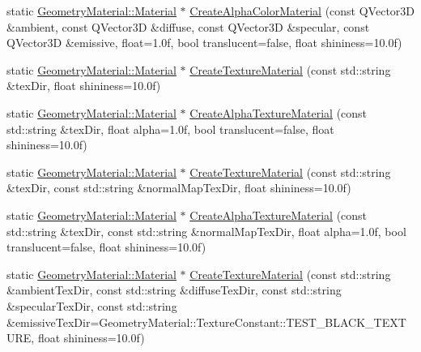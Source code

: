 \begin{DoxyCompactItemize}
\item 
static \mbox{\hyperlink{class_geometry_engine_1_1_geometry_material_1_1_material}{Geometry\+Material\+::\+Material}} $\ast$ \mbox{\hyperlink{class_geometry_engine_1_1_geometry_factory_a3d37605b9cc44fd0b3a058f961b76a35}{Create\+Alpha\+Color\+Material}} (const Q\+Vector3D \&ambient, const Q\+Vector3D \&diffuse, const Q\+Vector3D \&specular, const Q\+Vector3D \&emissive, float=1.\+0f, bool translucent=false, float shininess=10.\+0f)
\item 
static \mbox{\hyperlink{class_geometry_engine_1_1_geometry_material_1_1_material}{Geometry\+Material\+::\+Material}} $\ast$ \mbox{\hyperlink{class_geometry_engine_1_1_geometry_factory_a5362b394e75092bc6bb825c3eb7255ce}{Create\+Texture\+Material}} (const std\+::string \&tex\+Dir, float shininess=10.\+0f)
\item 
static \mbox{\hyperlink{class_geometry_engine_1_1_geometry_material_1_1_material}{Geometry\+Material\+::\+Material}} $\ast$ \mbox{\hyperlink{class_geometry_engine_1_1_geometry_factory_adae01f43608a0e55b1e9f831efed6940}{Create\+Alpha\+Texture\+Material}} (const std\+::string \&tex\+Dir, float alpha=1.\+0f, bool translucent=false, float shininess=10.\+0f)
\item 
static \mbox{\hyperlink{class_geometry_engine_1_1_geometry_material_1_1_material}{Geometry\+Material\+::\+Material}} $\ast$ \mbox{\hyperlink{class_geometry_engine_1_1_geometry_factory_a5f40952552368c0c0db6d07d42ef17c5}{Create\+Texture\+Material}} (const std\+::string \&tex\+Dir, const std\+::string \&normal\+Map\+Tex\+Dir, float shininess=10.\+0f)
\item 
static \mbox{\hyperlink{class_geometry_engine_1_1_geometry_material_1_1_material}{Geometry\+Material\+::\+Material}} $\ast$ \mbox{\hyperlink{class_geometry_engine_1_1_geometry_factory_a2b0e030c3c8c22b709f7a85934a3cdb4}{Create\+Alpha\+Texture\+Material}} (const std\+::string \&tex\+Dir, const std\+::string \&normal\+Map\+Tex\+Dir, float alpha=1.\+0f, bool translucent=false, float shininess=10.\+0f)
\item 
static \mbox{\hyperlink{class_geometry_engine_1_1_geometry_material_1_1_material}{Geometry\+Material\+::\+Material}} $\ast$ \mbox{\hyperlink{class_geometry_engine_1_1_geometry_factory_adcb6d5a41689e574ef468a21ae4c7516}{Create\+Texture\+Material}} (const std\+::string \&ambient\+Tex\+Dir, const std\+::string \&diffuse\+Tex\+Dir, const std\+::string \&specular\+Tex\+Dir, const std\+::string \&emissive\+Tex\+Dir=Geometry\+Material\+::\+Texture\+Constant\+::\+T\+E\+S\+T\+\_\+\+B\+L\+A\+C\+K\+\_\+\+T\+E\+X\+T\+U\+RE, float shininess=10.\+0f)

\end{DoxyCompactItemize}
